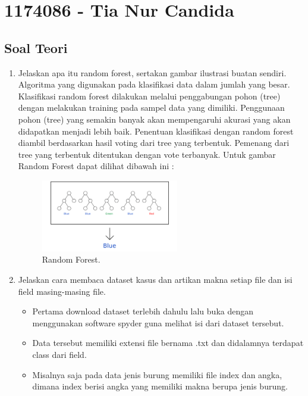 \section{1174086 - Tia Nur Candida}
\subsection{Soal Teori}
\begin{enumerate}

	\item Jelaskan apa itu random forest, sertakan gambar ilustrasi buatan sendiri.
	\hfill\break
	Algoritma yang digunakan pada klasifikasi data dalam jumlah yang besar. Klasifikasi random forest dilakukan melalui penggabungan pohon (tree) dengan melakukan training pada sampel data yang dimiliki. Penggunaan pohon (tree) yang semakin banyak akan mempengaruhi akurasi yang akan didapatkan menjadi lebih baik. Penentuan klasifikasi dengan random forest diambil berdasarkan hasil voting dari tree yang terbentuk. Pemenang dari tree yang terbentuk ditentukan dengan vote terbanyak. Untuk gambar Random Forest dapat dilihat dibawah ini :

	\begin{figure}[H]
	\centering
		\includegraphics[width=6cm]{figures/1174086/3/randomforest.png}
		\caption{Random Forest.}
	\end{figure}

	\item Jelaskan cara membaca dataset kasus dan artikan makna setiap file dan isi field masing-masing file.
	\hfill\break

	\begin{itemize}
		\item Pertama download dataset terlebih dahulu lalu buka dengan menggunakan software spyder guna melihat isi dari dataset tersebut.

		\item Data tersebut memiliki extensi file bernama .txt dan didalamnya terdapat class dari field.

		\item Misalnya saja pada data jenis burung memiliki file index dan angka, dimana index berisi angka yang memiliki makna berupa jenis burung.


\end{itemize}
\end{enumerate}

